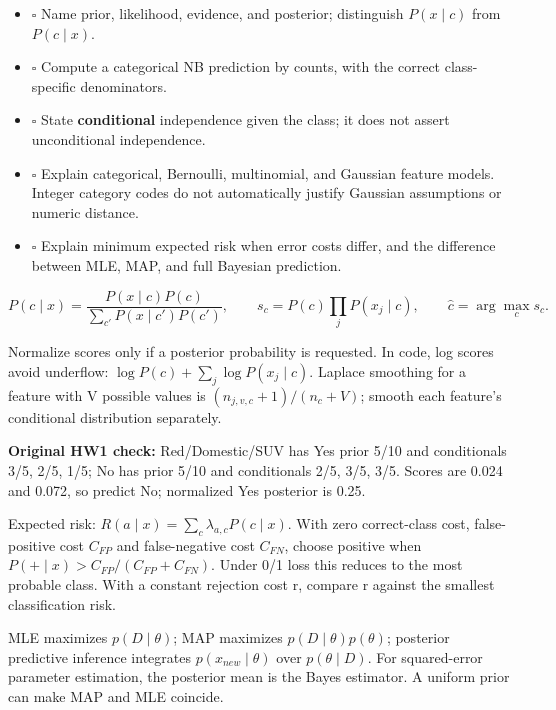 \documentclass[11pt]{article}
\begin{document}
\begin{itemize}
\item \(\square\) Name prior, likelihood, evidence, and posterior; distinguish $P(x\mid c)$ from $P(c\mid x)$.
\item \(\square\) Compute a categorical NB prediction by counts, with the correct class-specific denominators.
\item \(\square\) State \textbf{conditional} independence given the class; it does not assert unconditional independence.
\item \(\square\) Explain categorical, Bernoulli, multinomial, and Gaussian feature models. Integer category codes do not automatically justify Gaussian assumptions or numeric distance.
\item \(\square\) Explain minimum expected risk when error costs differ, and the difference between MLE, MAP, and full Bayesian prediction.
\end{itemize}

\[
P(c\mid x)=\frac{P(x\mid c)P(c)}{\sum_{c'}P(x\mid c')P(c')},\qquad
s_c=P(c)\prod_jP(x_j\mid c),\qquad \hat c=\arg\max_c s_c.
\]

Normalize scores only if a posterior probability is requested. In code, log scores avoid underflow: $\log P(c)+\sum_j\log P(x_j\mid c)$. Laplace smoothing for a feature with V possible values is $(n_{j,v,c}+1)/(n_c+V)$; smooth each feature's conditional distribution separately.

\textbf{Original HW1 check:} Red/\allowbreak{}Domestic/\allowbreak{}SUV has Yes prior 5/\allowbreak{}10 and conditionals 3/\allowbreak{}5, 2/\allowbreak{}5, 1/\allowbreak{}5; No has prior 5/\allowbreak{}10 and conditionals 2/\allowbreak{}5, 3/\allowbreak{}5, 3/\allowbreak{}5. Scores are 0.024 and 0.072, so predict No; normalized Yes posterior is 0.25.

Expected risk: $R(a\mid x)=\sum_c\lambda_{a,c}P(c\mid x)$. With zero correct-class cost, false-positive cost $C_{FP}$ and false-negative cost $C_{FN}$, choose positive when $P(+\mid x)>C_{FP}/(C_{FP}+C_{FN})$. Under 0/\allowbreak{}1 loss this reduces to the most probable class. With a constant rejection cost r, compare r against the smallest classification risk.

MLE maximizes $p(D\mid\theta)$; MAP maximizes $p(D\mid\theta)p(\theta)$; posterior predictive inference integrates $p(x_{new}\mid\theta)$ over $p(\theta\mid D)$. For squared-error parameter estimation, the posterior mean is the Bayes estimator. A uniform prior can make MAP and MLE coincide.
\end{document}
